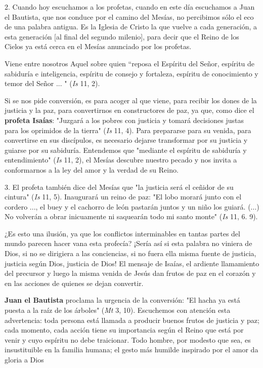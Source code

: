 2. Cuando hoy escuchamos a los profetas, cuando en este día escuchamos a
Juan el Bautista, que nos conduce por el camino del Mesías, no
percibimos sólo el eco de una palabra antigua. Es la Iglesia de Cristo
la que vuelve a cada generación, a esta generación {[}al final del
segundo milenio{]}, para decir que el Reino de los Cielos ya está cerca
en el Mesías anunciado por los profetas.

Viene entre nosotros Aquel sobre quien ``reposa el Espíritu del Señor,
espíritu de sabiduría e inteligencia, espíritu de consejo y fortaleza,
espíritu de conocimiento y temor del Señor ... " (\emph{Is} 11, 2).

Si se nos pide conversión, es para acoger al que viene, para recibir los
dones de la justicia y la paz, para convertirnos en constructores de
paz, ya que, como dice el \textbf{profeta Isaías}: "Juzgará a los pobres
con justicia y tomará decisiones justas para los oprimidos de la tierra"
(\emph{Is} 11, 4). Para prepararse para su venida, para convertirse en
sus discípulos, es necesario dejarse transformar por su justicia y
guiarse por su sabiduría. Entendemos que "mediante el espíritu de
sabiduría y entendimiento" (\emph{Is} 11, 2), el Mesías descubre nuestro
pecado y nos invita a conformarnos a la ley del amor y la verdad de su
Reino.

3. El profeta también dice del Mesías que "la justicia será el ceñidor
de su cintura" (\emph{Is} 11, 5). Inaugurará un reino de paz: "El lobo
morará junto con el cordero ..., el buey y el cachorro de león pastarán
juntos y un niño los guiará. (...) No volverán a obrar inicuamente ni
saquearán todo mi santo monte" (\emph{Is} 11, 6. 9).

¿Es esto una ilusión, ya que los conflictos interminables en tantas
partes del mundo parecen hacer vana esta profecía? ¡Sería así si esta
palabra no viniera de Dios, si no se dirigiera a las conciencias, si no
fuera ella misma fuente de justicia, justicia según Dios, justicia de
Dios! El mensaje de Isaías, el ardiente llamamiento del precursor y
luego la misma venida de Jesús dan frutos de paz en el corazón y en las
acciones de quienes se dejan convertir.

\textbf{Juan el Bautista} proclama la urgencia de la conversión: "El
hacha ya está puesta a la raíz de los árboles" (\emph{Mt} 3, 10).
Escuchemos con atención esta advertencia: toda persona está llamada a
producir buenos frutos de justicia y paz; cada momento, cada acción
tiene su importancia según el Reino que está por venir y cuyo espíritu
no debe traicionar. Todo hombre, por modesto que sea, es insustituible
en la familia humana; el gesto más humilde inspirado por el amor da
gloria a Dios

